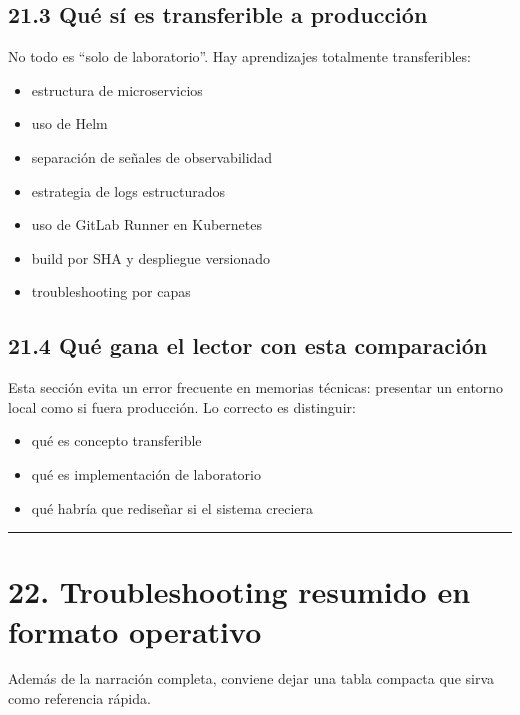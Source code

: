 \documentclass[
a4paper,
12pt]{report}
\providecommand{\tightlist}{%
  \setlength{\itemsep}{0pt}\setlength{\parskip}{0pt}}
\begin{document}
\section{21.3 Qué sí es transferible a
producción}\label{quuxe9-suxed-es-transferible-a-producciuxf3n}

No todo es ``solo de laboratorio''. Hay aprendizajes totalmente
transferibles:

\begin{itemize}
\tightlist
\item
  estructura de microservicios
\item
  uso de Helm
\item
  separación de señales de observabilidad
\item
  estrategia de logs estructurados
\item
  uso de GitLab Runner en Kubernetes
\item
  build por SHA y despliegue versionado
\item
  troubleshooting por capas
\end{itemize}

\section{21.4 Qué gana el lector con esta
comparación}\label{quuxe9-gana-el-lector-con-esta-comparaciuxf3n}

Esta sección evita un error frecuente en memorias técnicas: presentar un
entorno local como si fuera producción. Lo correcto es distinguir:

\begin{itemize}
\tightlist
\item
  qué es concepto transferible
\item
  qué es implementación de laboratorio
\item
  qué habría que rediseñar si el sistema creciera
\end{itemize}

\begin{center}\rule{0.5\linewidth}{0.5pt}\end{center}

\chapter{22. Troubleshooting resumido en formato
operativo}\label{troubleshooting-resumido-en-formato-operativo}

Además de la narración completa, conviene dejar una tabla compacta que
sirva como referencia rápida.
\end{document}
